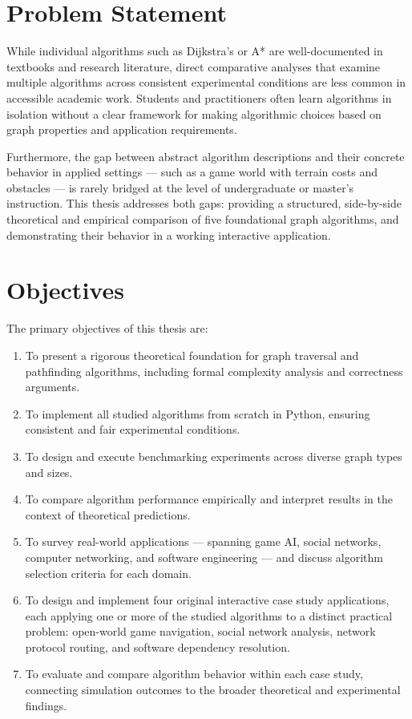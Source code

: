\documentclass[12pt, a4paper, oneside]{report}
\theoremstyle{definition}
\begin{document}
\section{Problem Statement}

While individual algorithms such as Dijkstra's or A* are well-documented in textbooks and research literature, direct comparative analyses that examine multiple algorithms across consistent experimental conditions are less common in accessible academic work. Students and practitioners often learn algorithms in isolation without a clear framework for making algorithmic choices based on graph properties and application requirements.

Furthermore, the gap between abstract algorithm descriptions and their concrete behavior in applied settings — such as a game world with terrain costs and obstacles — is rarely bridged at the level of undergraduate or master's instruction. This thesis addresses both gaps: providing a structured, side-by-side theoretical and empirical comparison of five foundational graph algorithms, and demonstrating their behavior in a working interactive application.

\section{Objectives}

The primary objectives of this thesis are:

\begin{enumerate}[label=\arabic*.]
    \item To present a rigorous theoretical foundation for graph traversal and pathfinding algorithms, including formal complexity analysis and correctness arguments.
    \item To implement all studied algorithms from scratch in Python, ensuring consistent and fair experimental conditions.
    \item To design and execute benchmarking experiments across diverse graph types and sizes.
    \item To compare algorithm performance empirically and interpret results in the context of theoretical predictions.
    \item To survey real-world applications — spanning game AI, social networks, computer networking, and software engineering — and discuss algorithm selection criteria for each domain.
    \item To design and implement four original interactive case study applications, each applying one or more of the studied algorithms to a distinct practical problem: open-world game navigation, social network analysis, network protocol routing, and software dependency resolution.
    \item To evaluate and compare algorithm behavior within each case study, connecting simulation outcomes to the broader theoretical and experimental findings.
\end{enumerate}
\end{document}
